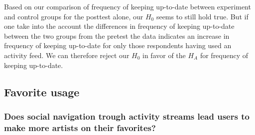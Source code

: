 \parabreak

Based on our comparison of frequency of keeping up-to-date between experiment
and control groups for the posttest alone, our $H_0$ seems to still hold true.
But if one take into the account the differences in frequency of keeping
up-to-date between the two groups from the pretest the data indicates
an increase in frequency of keeping up-to-date for only those respondents
having used an activity feed. We can therefore reject our $H_0$ in favor
of the $H_A$ for frequency of keeping up-to-date.


\subsection{Favorite usage}

\subsubsection{%
  Does social navigation trough activity streams lead users to make
  more artists on \urort{} their favorites?
}

